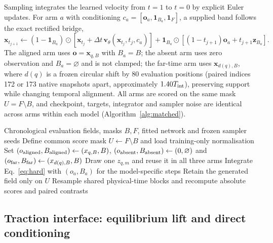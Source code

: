 Sampling integrates the learned velocity from $t=1$ to $t=0$ by explicit Euler updates. For arm
$a$ with conditioning $c_a=[\mathbf o_a,\mathbf 1_{B_a},\mathbf 1_F]$, a supplied band follows the
exact rectified bridge,
\begin{equation}
\mathbf x_{t_{j+1}}\leftarrow
(1-\mathbf 1_{B_a})\odot
\left[\mathbf x_{t_j}+\Delta t\,
\mathbf v_\theta(\mathbf x_{t_j},t_j,c_a)\right]
+\mathbf 1_{B_a}\odot
\left[(1-t_{j+1})\mathbf o_a+t_{j+1}\mathbf z_{B_a}\right].
\label{eq:hard}
\end{equation}
The aligned arm uses $\mathbf o=\mathbf x_{q,B}$ with $B_a=B$; the absent arm uses zero
observation and $B_a=\varnothing$ and is not clamped; the far-time arm uses $\mathbf x_{d(q),B}$,
where $d(q)$ is a frozen circular shift by 80 evaluation positions (paired indices 172 or 173
native snapshots apart, approximately $1.40T_{\rm int}$), preserving support while changing
temporal alignment. All arms are scored on the same mask $U=F\setminus B$, and checkpoint,
targets, integrator and sampler noise are identical across arms within each model
(Algorithm~\ref{alg:matched}).

\begin{algorithm}[t]
\caption{Matched wall-information intervention}\label{alg:matched}
\begin{algorithmic}[1]
\Require Chronological evaluation fields, masks $B,F$, fitted network and frozen sampler seeds
\State Define common score mask $U\gets F\setminus B$ and load training-only normalisation
  \State Set $(o_{\rm aligned},B_{\rm aligned})\gets(x_{q,B},B)$,
  $(o_{\rm absent},B_{\rm absent})\gets(0,\varnothing)$ and
  $(o_{\rm far},B_{\rm far})\gets(x_{d(q),B},B)$
    \State Draw one $z_{q,m}$ and reuse it in all three arms
      \State Integrate Eq.~\eqref{eq:hard} with $(o_a,B_a)$ for the model-specific steps
      \State Retain the generated field only on $U$
    \EndFor
  \EndFor
\EndFor
\State Resample shared physical-time blocks and recompute absolute scores and paired contrasts
\end{algorithmic}
\end{algorithm}

\subsection{Traction interface: equilibrium lift and direct conditioning}\label{sec:interfaceexec}\label{sec:directtraction}

